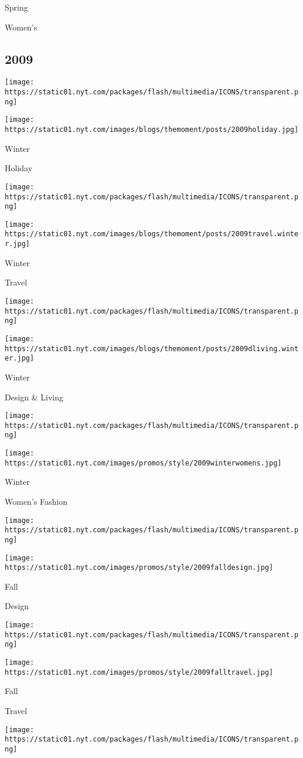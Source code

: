 Spring

Women's

\hypertarget{2009}{%
\subsection{2009}\label{2009}}

\texttt{[image: https://static01.nyt.com/packages/flash/multimedia/ICONS/transparent.png]}

\texttt{[image: https://static01.nyt.com/images/blogs/themoment/posts/2009holiday.jpg]}

Winter

Holiday

\texttt{[image: https://static01.nyt.com/packages/flash/multimedia/ICONS/transparent.png]}

\texttt{[image: https://static01.nyt.com/images/blogs/themoment/posts/2009travel.winter.jpg]}

Winter

Travel

\texttt{[image: https://static01.nyt.com/packages/flash/multimedia/ICONS/transparent.png]}

\texttt{[image: https://static01.nyt.com/images/blogs/themoment/posts/2009dliving.winter.jpg]}

Winter

Design \& Living

\texttt{[image: https://static01.nyt.com/packages/flash/multimedia/ICONS/transparent.png]}

\texttt{[image: https://static01.nyt.com/images/promos/style/2009winterwomens.jpg]}

Winter

Women's Fashion

\texttt{[image: https://static01.nyt.com/packages/flash/multimedia/ICONS/transparent.png]}

\texttt{[image: https://static01.nyt.com/images/promos/style/2009falldesign.jpg]}

Fall

Design

\texttt{[image: https://static01.nyt.com/packages/flash/multimedia/ICONS/transparent.png]}

\texttt{[image: https://static01.nyt.com/images/promos/style/2009falltravel.jpg]}

Fall

Travel

\texttt{[image: https://static01.nyt.com/packages/flash/multimedia/ICONS/transparent.png]}

